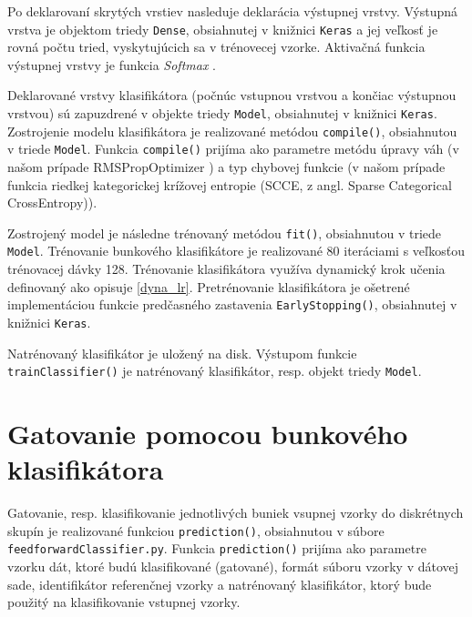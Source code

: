 Po deklarovaní skrytých vrstiev nasleduje deklarácia výstupnej vrstvy. Výstupná vrstva je objektom triedy \texttt{Dense}, obsiahnutej v knižnici \texttt{Keras} a jej veľkosť je rovná počtu tried, vyskytujúcich sa v trénovecej vzorke. Aktivačná funkcia výstupnej vrstvy je funkcia \textit{Softmax} \cite{Goh1995}.

Deklarované vrstvy klasifikátora (počnúc vstupnou vrstvou a končiac výstupnou vrstvou) sú zapuzdrené v objekte triedy \texttt{Model}, obsiahnutej v knižnici \texttt{Keras}. Zostrojenie modelu klasifikátora je realizované metódou \texttt{compile()}, obsiahnutou v triede \texttt{Model}. Funkcia \texttt{compile()} prijíma ako parametre metódu úpravy váh (v našom prípade RMSPropOptimizer \cite{Goh1995}) a typ chybovej funkcie (v našom prípade funkcia riedkej kategorickej krížovej entropie (SCCE, z angl. Sparse Categorical CrossEntropy)).

Zostrojený model je následne trénovaný metódou \texttt{fit()}, obsiahnutou v triede \texttt{Model}. Trénovanie bunkového klasifikátore je realizované 80 iteráciami s veľkosťou trénovacej dávky 128. Trénovanie klasifikátora využíva dynamický krok učenia definovaný ako opisuje \ref{dyna_lr}. Pretrénovanie klasifikátora je ošetrené implementáciou funkcie predčasného zastavenia \texttt{EarlyStopping()}, obsiahnutej v knižnici \texttt{Keras}.

Natrénovaný klasifikátor je uložený na disk. Výstupom funkcie \texttt{trainClassifier()} je natrénovaný klasifikátor, resp. objekt triedy \texttt{Model}.

\section{Gatovanie pomocou bunkového klasifikátora}
\label{gateFF}

Gatovanie, resp. klasifikovanie jednotlivých buniek vsupnej vzorky do diskrétnych skupín je realizované funkciou \texttt{prediction()}, obsiahnutou v súbore \texttt{feedforwardClassifier.py}. Funkcia \texttt{prediction()} prijíma ako parametre vzorku dát, ktoré budú klasifikované (gatované), formát súboru vzorky v dátovej sade, identifikátor referenčnej vzorky a natrénovaný klasifikátor, ktorý bude použitý na klasifikovanie vstupnej vzorky.

